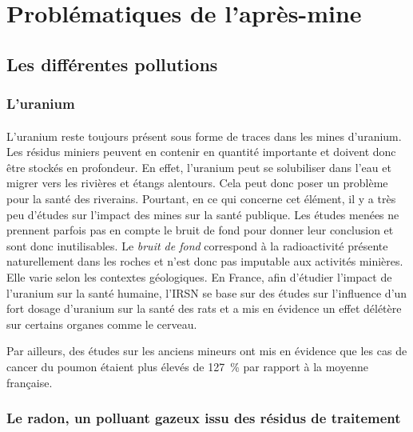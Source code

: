 \documentclass{article}
\begin{document}
\newpage
\section{Problématiques de l’après-mine}
\subsection{Les différentes pollutions}
\subsubsection{L'uranium}

\paragraph{} L'uranium reste toujours présent sous forme de traces dans les mines d'uranium. Les résidus miniers peuvent en contenir en quantité importante et doivent donc être stockés en profondeur. En effet, l'uranium peut se solubiliser dans l'eau et migrer vers les rivières et étangs alentours. Cela peut donc poser un problème pour la santé des riverains. Pourtant, en ce qui concerne cet élément, il y a très peu d'études sur l’impact des mines sur la santé publique. Les études menées ne prennent parfois pas en compte le bruit de fond pour donner leur conclusion et sont donc inutilisables. Le \emph{bruit de fond} correspond à la radioactivité présente naturellement dans les roches et n'est donc pas imputable aux activités minières. Elle varie selon les contextes géologiques. En France, afin d’étudier l’impact de l’uranium sur la santé humaine, l’IRSN se base sur des études sur l’influence d’un fort dosage d’uranium sur la santé des rats et a mis en évidence un effet délétère sur certains organes comme le cerveau.

Par ailleurs, des études sur les anciens mineurs ont mis en évidence que les cas de cancer du poumon étaient plus élevés de 127~\% par rapport à la moyenne française.


\subsubsection{Le radon, un polluant gazeux issu des résidus de traitement}
\end{document}

